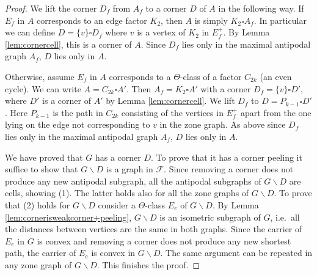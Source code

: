 \documentclass[final,11pt]{article}
\newcommand{\comment}[1]{\textcolor{red}{#1}}
\begin{document}
\begin{proof}
We lift the corner $D_f$ from $A_f$ to a corner $D$ of $A$ in the following way. If $E_f$ in $A$ corresponds to an edge factor $K_2$, then $A$ is simply $K_2 \square A_f$. In particular we can define $D= \{v\} \square D_f$ where $v$ is a vertex of $K_2$ in $E_f^+$. By Lemma \ref{lem:cornercell}, this is a corner of $A$. Since $D_f$ lies only in the maximal antipodal graph $A_f$, $D$ lies only in $A$.


Otherwise, assume $E_f$ in $A$ corresponds to a $\Theta$-class of a factor $C_{2k}$ (an even cycle). We can write $A=C_{2k} \square A'$. Then $A_f = K_2 \square A'$ with a corner $D_f = \{v\} \square D'$, where $D'$ is a corner of $A'$ by Lemma \ref{lem:cornercell}. We lift $D_f$ to $D = P_{k-1} \square D'$. Here $P_{k-1}$ is the path in $C_{2k}$ consisting of the vertices in $E_f^+$ apart from the one lying on the edge not corresponding to $v$ in the zone graph. As above since $D_f$ lies only in the maximal antipodal graph $A_f$, $D$ lies only in $A$.

We have proved that $G$ has a corner $D$. To prove that it has a corner peeling it suffice to show that $G \backslash D$ is a graph in $\mathcal{F}$. Since removing a corner does not produce any new antipodal subgraph, all the antipodal subgraphs of $G \backslash D$ are cells, showing (1). The latter holds also for all the zone graphs of $G \backslash D$. To prove that (2) holds for $G \backslash D$ consider a $\Theta$-class $E_e$ of $G \backslash D$. By Lemma \ref{lem:cornerisweakcorner+peeling}, $G \backslash D$ is an isometric subgraph of $G$, i.e.~all the distances between vertices are the same in both graphs. Since the carrier of $E_e$ in $G$ is convex and removing a corner does not produce any new shortest path, the carrier of  $E_e$  is convex in $G \backslash D$. 
The same argument can be repeated in any zone graph of $G \backslash D$. This finishes the proof.
\end{proof}
\end{document}
